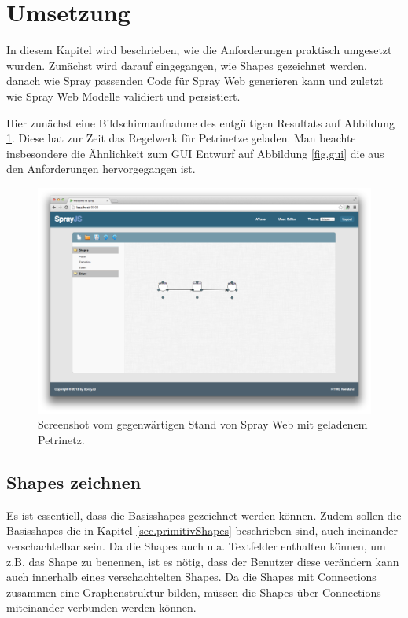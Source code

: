 \section{Umsetzung}

In diesem Kapitel wird beschrieben, wie die Anforderungen praktisch
umgesetzt wurden. Zunächst wird darauf eingegangen, wie Shapes gezeichnet
werden, danach wie Spray passenden Code für Spray Web generieren kann
und zuletzt wie Spray Web Modelle validiert und persistiert.

Hier zunächst eine Bildschirmaufnahme des entgültigen Resultats
auf Abbildung \ref{fig.screenshot}.
Diese hat zur Zeit das Regelwerk für Petrinetze geladen.
Man beachte insbesondere die Ähnlichkeit zum GUI Entwurf auf Abbildung
\ref{fig.gui} die aus den Anforderungen hervorgegangen ist.

\begin{figure}[h!]
  \centering
  \includegraphics[width=1.0\textwidth]{Figures/Screenshot.png}
  \caption{Screenshot vom gegenwärtigen Stand von Spray Web mit geladenem Petrinetz.}\label{fig.screenshot}
\end{figure}

\subsection{Shapes zeichnen}

Es ist essentiell, dass die Basisshapes gezeichnet werden können.
Zudem sollen die Basisshapes die in Kapitel \ref{sec.primitivShapes}
beschrieben sind, auch ineinander verschachtelbar sein.
Da die Shapes auch u.a. Textfelder enthalten können, um z.B. das Shape
zu benennen, ist es nötig, dass der Benutzer diese verändern kann auch
innerhalb eines verschachtelten Shapes.
Da die Shapes mit Connections zusammen eine Graphenstruktur bilden,
müssen die Shapes über Connections miteinander verbunden werden können.

